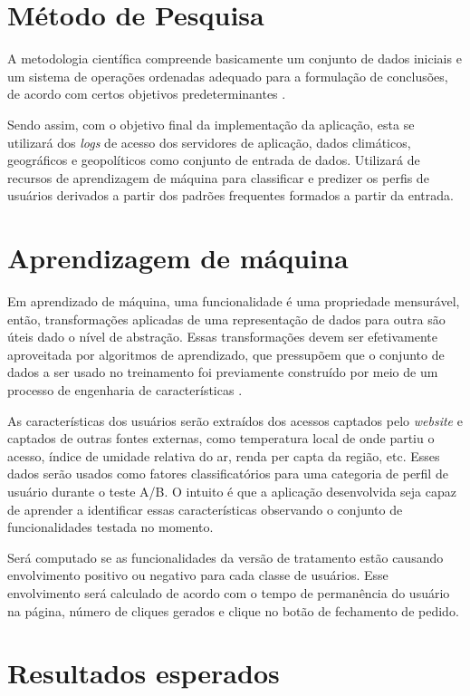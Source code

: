 \documentclass[12pt]{article}
\begin{document}
\section{Método de Pesquisa}

A metodologia científica compreende basicamente um conjunto de dados iniciais e um sistema de operações ordenadas adequado para a formulação de conclusões, de acordo com certos objetivos predeterminantes \cite{tartuce:2006}.

Sendo assim, com o objetivo final da implementação da aplicação, esta se utilizará dos \textit{logs} de acesso dos servidores de aplicação, dados climáticos, geográficos e geopolíticos como conjunto de entrada de dados. Utilizará de recursos de aprendizagem de máquina para classificar e predizer os perfis de usuários derivados a partir dos padrões frequentes formados a partir da entrada.   

\section{Aprendizagem de máquina}

Em aprendizado de máquina, uma funcionalidade é uma propriedade mensurável, então, transformações aplicadas de uma representação de dados para outra são úteis dado o nível de abstração. Essas transformações devem ser efetivamente aproveitada por algoritmos de aprendizado, que pressupõem que o conjunto de dados a ser usado no treinamento foi previamente construído por meio de um processo de engenharia de características \cite{bezerraintroduccao}.

As características dos usuários serão extraídos dos acessos captados pelo \textit{website} e captados de outras fontes externas, como temperatura local de onde partiu o acesso, índice de umidade relativa do ar, renda per capta da região, etc. Esses dados serão usados como fatores classificatórios para uma categoria de perfil de usuário durante o teste A/B. O intuito é que a aplicação desenvolvida seja capaz de aprender a identificar essas características observando o conjunto de funcionalidades testada no momento.

Será computado se as funcionalidades da versão de tratamento estão causando envolvimento positivo ou negativo para cada classe de usuários. Esse envolvimento será calculado de acordo com o tempo de permanência do usuário na página, número de cliques gerados e clique no botão de fechamento de pedido.

\section{Resultados esperados}
\end{document}
